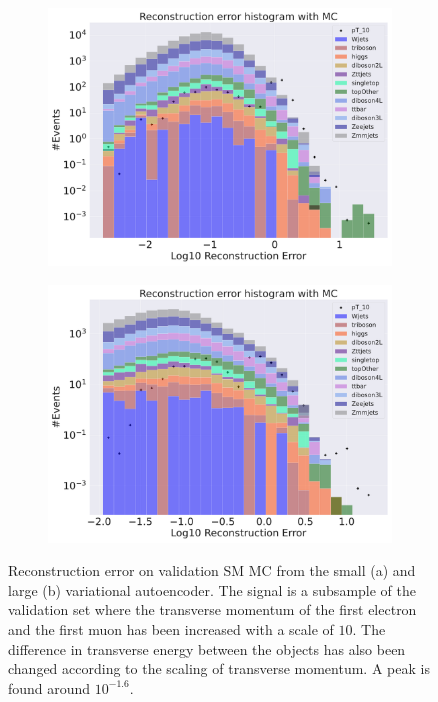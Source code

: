 \begin{figure}[!htb]
    \centering
    \begin{subfigure}{.45\textwidth}
        \includegraphics[width=\textwidth]{Figures/VAE_testing/small/b_data_recon_big_rm3_feats_sig_pT_10.pdf}
        \caption{ }
        \label{fig:VAE_small_pt_10}
    \end{subfigure}
    \hfill 
    \begin{subfigure}{.45\textwidth}
        \includegraphics[width=\textwidth]{Figures/VAE_testing/big/b_data_recon_big_rm3_feats_sig_pT_10.pdf}
        \caption{}
        \label{fig:VAE_big_pt_10}
    \end{subfigure}
    \hfill 
    \caption[VAE | Reconstruction error $p_T$ altering of 10]{Reconstruction error on validation SM MC from the small (a) and large (b) variational autoencoder. The signal is a subsample of the validation 
    set where the transverse momentum of the first electron and the first muon has been increased with a scale of $10$. The difference in transverse energy between the objects has also been changed according to the scaling of transverse momentum. 
    A peak is found around $10^{-1.6}$.}
    \label{fig:VAE_big_small_pt_10}
\end{figure}


